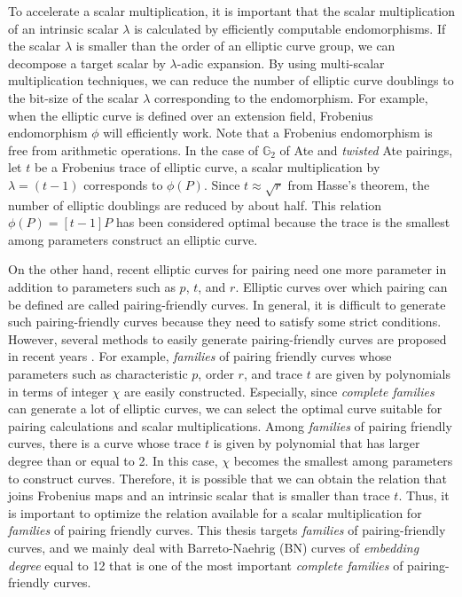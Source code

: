 To accelerate a scalar multiplication, it is important that the scalar multiplication of an intrinsic scalar $\lambda$ is calculated by efficiently computable endomorphisms.
If the scalar $\lambda$ is smaller than the order of an elliptic curve group, we can decompose a target scalar by $\lambda$-adic expansion.
By using multi-scalar multiplication techniques, we can reduce the number of elliptic curve doublings to the bit-size of the scalar $\lambda$ corresponding to the endomorphism.
For example, when the elliptic curve is defined over an extension field, Frobenius endomorphism $\phi$ will efficiently work.
Note that a Frobenius endomorphism is free from arithmetic operations.
In the case of $\mathbb{G}_2$ of Ate and {\it twisted} Ate pairings, let $t$ be a Frobenius trace of elliptic curve, a scalar multiplication by $\lambda = (t-1)$ corresponds to $\phi(P)$.
Since $t\approx\sqrt{r}$ from Hasse's theorem, the number of elliptic doublings are reduced by about half.
This relation $\phi(P)=[t-1]P$ has been considered optimal because the trace is the smallest among parameters construct an elliptic curve. 

On the other hand, recent elliptic curves for pairing need one more parameter in addition to parameters such as $p$, $t$, and $r$.  
Elliptic curves over which pairing can be defined are called pairing-friendly curves.
In general, it is difficult to generate such pairing-friendly curves because they need to satisfy some strict conditions.
However, several methods to easily generate pairing-friendly curves are proposed in recent years \cite{Taxo}.
For example, {\it families} of pairing friendly curves whose parameters such as characteristic $p$, order $r$, and trace $t$ are given by polynomials in terms of integer $\chi$ are easily constructed.
Especially, since {\it complete families} can generate a lot of elliptic curves, we can select the optimal curve suitable for pairing calculations and scalar multiplications.
Among {\it families} of pairing friendly curves, there is a curve whose trace $t$ is given by polynomial that has larger degree than or equal to 2.
In this case, $\chi$ becomes the smallest among parameters to construct curves.
Therefore, it is possible that we can obtain the relation that joins Frobenius maps and an intrinsic scalar that is smaller than trace $t$.
Thus, it is important to optimize the relation available for a scalar multiplication for {\it families} of pairing friendly curves.
This thesis targets {\it families} of pairing-friendly curves, and we mainly deal with Barreto-Naehrig (BN) curves of {\it embedding degree} equal to 12 that is one of the most important {\it complete families} of pairing-friendly curves.

